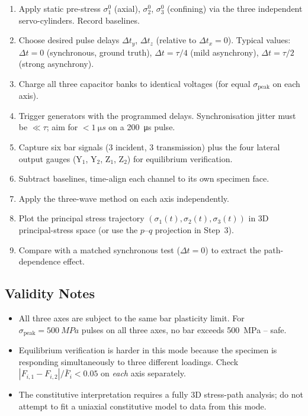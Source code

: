 \documentclass[11pt,a4paper]{article}
\providecommand{\SI}[2]{\qty{#1}{#2}}
\newcommand{\sig}{\sigma}
\newcommand{\sigpeak}{\sig_{\text{peak}}}
\begin{document}
\begin{stepbox}
\begin{enumerate}[leftmargin=*, itemsep=3pt]
  \item Apply static pre-stress $\sig_1^0$ (axial), $\sig_2^0$, $\sig_3^0$
        (confining) via the three independent servo-cylinders. Record baselines.
  \item Choose desired pulse delays $\Delta t_y$, $\Delta t_z$ (relative to
        $\Delta t_x = 0$). Typical values:
        $\Delta t = 0$ (synchronous, ground truth), $\Delta t = \tau/4$
        (mild asynchrony), $\Delta t = \tau/2$ (strong asynchrony).
  \item Charge all three capacitor banks to identical voltages (for equal
        $\sigpeak$ on each axis).
  \item Trigger generators with the programmed delays. Synchronisation jitter
        must be $\ll \tau$; aim for $< \SI{1}{\micro s}$ on a \SI{200}{\micro s}
        pulse.
  \item Capture six bar signals (3 incident, 3 transmission) plus the four
        lateral output gauges (Y$_1$, Y$_2$, Z$_1$, Z$_2$) for equilibrium
        verification.
  \item Subtract baselines, time-align each channel to its own specimen face.
  \item Apply the three-wave method on each axis independently.
  \item Plot the principal stress trajectory $(\sig_1(t), \sig_2(t), \sig_3(t))$
        in 3D principal-stress space (or use the $p$--$q$ projection in Step~3).
  \item Compare with a matched synchronous test ($\Delta t = 0$) to extract the
        path-dependence effect.
\end{enumerate}
\end{stepbox}

\subsection{Validity Notes}

\begin{itemize}[leftmargin=*]
  \item All three axes are subject to the same bar plasticity limit. For
        $\sigpeak = \SI{500}{MPa}$ pulses on all three axes, no bar exceeds
        \SI{500}{MPa} -- safe.
  \item Equilibrium verification is harder in this mode because the specimen
        is responding simultaneously to three different loadings. Check
        $|F_{i,1} - F_{i,2}| / \bar F_i < 0.05$ on \emph{each} axis separately.
  \item The constitutive interpretation requires a fully 3D stress-path
        analysis; do not attempt to fit a uniaxial constitutive model to data
        from this mode.
\end{itemize}
\end{document}
